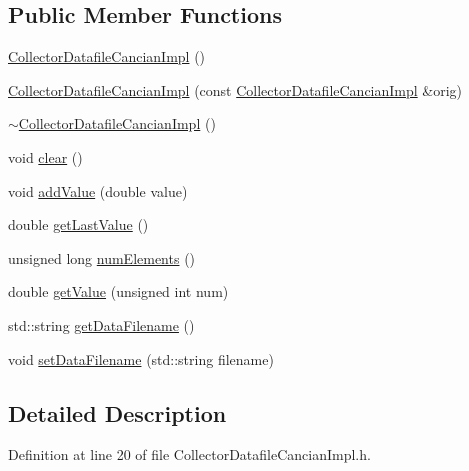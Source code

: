 \subsection*{Public Member Functions}
\begin{DoxyCompactItemize}
\item 
\hyperlink{class_collector_datafile_cancian_impl_a7754e99ffee4aacf1538c26376ab6e00}{Collector\-Datafile\-Cancian\-Impl} ()
\item 
\hyperlink{class_collector_datafile_cancian_impl_ae69bb092854c71eb188d2df45487cdb4}{Collector\-Datafile\-Cancian\-Impl} (const \hyperlink{class_collector_datafile_cancian_impl}{Collector\-Datafile\-Cancian\-Impl} \&orig)
\item 
\hyperlink{class_collector_datafile_cancian_impl_a1c7a005af545e3d78f34e84350c199bf}{$\sim$\-Collector\-Datafile\-Cancian\-Impl} ()
\item 
void \hyperlink{class_collector_datafile_cancian_impl_a9fe0e4e764f1cc868d9c91bc68ff0ed8}{clear} ()
\item 
void \hyperlink{class_collector_datafile_cancian_impl_ab6a718100f5bdd04e3fef9edf23045ec}{add\-Value} (double value)
\item 
double \hyperlink{class_collector_datafile_cancian_impl_a24b93dedb5f56e710e810c05e89dc36f}{get\-Last\-Value} ()
\item 
unsigned long \hyperlink{class_collector_datafile_cancian_impl_ab10e682e4b991a881efb56caebb4efa9}{num\-Elements} ()
\item 
double \hyperlink{class_collector_datafile_cancian_impl_af06ad080b3b03269da8feff74a101670}{get\-Value} (unsigned int num)
\item 
std\-::string \hyperlink{class_collector_datafile_cancian_impl_a216e46f526becc3dd4b4772e07256b81}{get\-Data\-Filename} ()
\item 
void \hyperlink{class_collector_datafile_cancian_impl_a7fb058367bd603743d3636c39c44ca56}{set\-Data\-Filename} (std\-::string filename)
\end{DoxyCompactItemize}


\subsection{Detailed Description}


Definition at line 20 of file Collector\-Datafile\-Cancian\-Impl.\-h.



